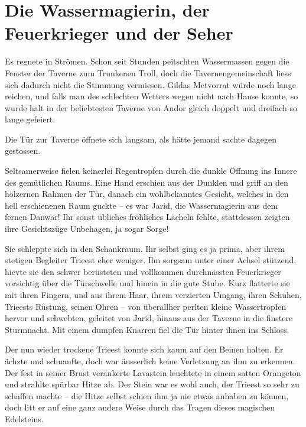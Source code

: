 \newpage
\section{Die Wassermagierin, der Feuerkrieger und der Seher}



Es regnete in Strömen. Schon seit Stunden peitschten Wassermassen gegen die Fenster der Taverne zum Trunkenen Troll, doch die Tavernengemeinschaft liess sich dadurch nicht die Stimmung vermiesen. Gildas Metvorrat würde noch lange reichen, und falls man des schlechten Wetters wegen nicht nach Hause konnte, so wurde halt in der beliebtesten Taverne von Andor gleich doppelt und dreifach so lange gefeiert.

Die Tür zur Taverne öffnete sich langsam, als hätte jemand sachte dagegen gestossen.

Seltsamerweise fielen keinerlei Regentropfen durch die dunkle Öffnung ins Innere des gemütlichen Raums. Eine Hand erschien aus der Dunklen und griff an den hölzernen Rahmen der Tür, danach ein wohlbekanntes Gesicht, welches in den hell erschienenen Raum guckte – es war Jarid, die Wassermagierin aus dem fernen Danwar! Ihr sonst übliches fröhliches Lächeln fehlte, stattdessen zeigten ihre Gesichtszüge Unbehagen, ja sogar Sorge!

Sie schleppte sich in den Schankraum. Ihr selbst ging es ja prima, aber ihrem stetigen Begleiter Trieest eher weniger. Ihn sorgsam unter einer Achsel stützend, hievte sie den schwer berüsteten und vollkommen durchnässten Feuerkrieger vorsichtig über die Türschwelle und hinein in die gute Stube. Kurz flatterte sie mit ihren Fingern, und aus ihrem Haar, ihrem verzierten Umgang, ihren Schuhen, Trieests Rüstung, seinen Ohren – von überallher perlten kleine Wassertropfen hervor und schwebten, geleitet von Jarid, hinaus aus der Taverne in die finstere Sturmnacht. Mit einem dumpfen Knarren fiel die Tür hinter ihnen ins Schloss.

Der nun wieder trockene Trieest konnte sich kaum auf den Beinen halten. Er ächzte und schnaufte, doch war äusserlich keine Verletzung an ihm zu erkennen. Der fest in seiner Brust verankerte Lavastein leuchtete in einem satten Orangeton und strahlte spürbar Hitze ab. Der Stein war es wohl auch, der Trieest so sehr zu schaffen machte – die Hitze selbst schien ihm ja nie etwas anhaben zu können, doch litt er auf eine ganz andere Weise durch das Tragen dieses magischen Edelsteins.\bigskip



